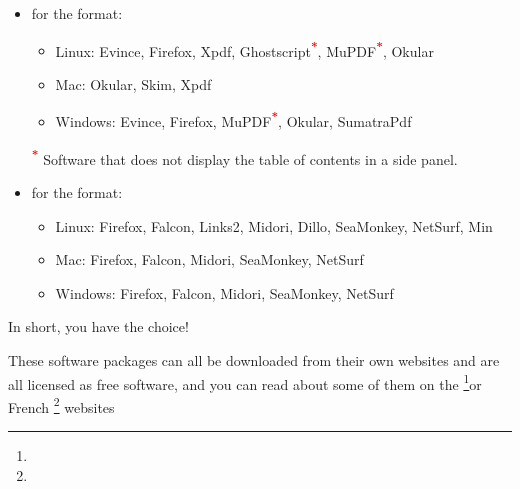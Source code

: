 \begin{itemize}
	\item for the  format:
		\begin{itemize}
			\item[\textopenbullet] Linux: Evince, Firefox, Xpdf, Ghostscript\textsuperscript{\textcolor{red}{\textbf{*}}}, MuPDF\textsuperscript{\textcolor{red}{\textbf{*}}}, Okular
			\item[\textopenbullet] Mac: Okular, Skim, Xpdf
			\item[\textopenbullet] Windows: Evince, Firefox, MuPDF\textsuperscript{\textcolor{red}{\textbf{*}}}, Okular, SumatraPdf
		\end{itemize}
		\textsuperscript{\textcolor{red}{\textbf{*}}} Software that does not display the table of contents in a side panel.
	\item for the  format:
		\begin{itemize}
			\item[\textopenbullet] Linux: Firefox, Falcon, Links2, Midori, Dillo, SeaMonkey, NetSurf, Min
			\item[\textopenbullet] Mac: Firefox, Falcon, Midori, SeaMonkey, NetSurf
			\item[\textopenbullet] Windows: Firefox, Falcon, Midori, SeaMonkey, NetSurf
		\end{itemize}
\end{itemize}



In short, you have the choice!



These software packages can all be downloaded from their own websites and are all licensed as \gls{free software}, and you can read about some of them on the \footnote{\urlFreeSoftwareDirectory{}}or French \footnote{\urlFramasoftLogiciels{}} websites

